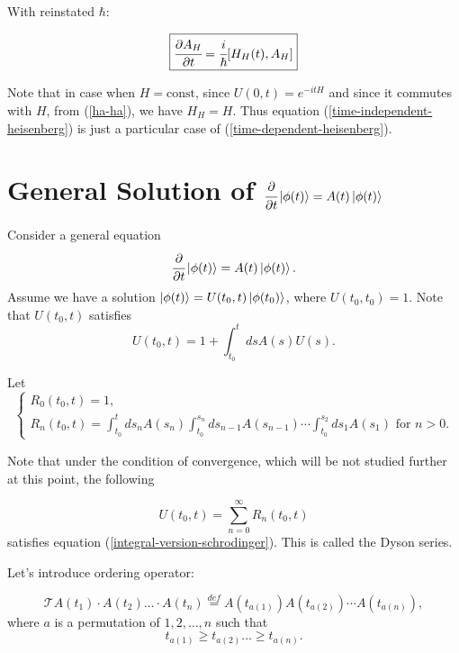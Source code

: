 \documentclass[main.tex]{subfiles}
\begin{document}
With reinstated $\hbar$:

\begin{equation}
\boxed{
\cfrac{\partial A_H}{\partial t} = \cfrac{i}{\hbar} [H_H(t), A_H]
}
\end{equation}

Note that in case when $H = \text{const}$, since $U(0, t) = e^{-itH}$ and since it commutes with $H$, from (\ref{ha-ha}), we have $H_H = H$. Thus equation (\ref{time-independent-heisenberg}) is just a particular case of (\ref{time-dependent-heisenberg}).
\section{General Solution of $\cfrac{\partial}{\partial t}\ket{\phi(t)} = A(t) \ket{\phi(t)}$}

Consider a general equation
\begin{equation}
\cfrac{\partial}{\partial t}\ket{\phi(t)} = A(t) \ket{\phi(t)}.
\end{equation}
Assume we have a solution $\ket{\phi(t)} = U(t_0, t)\ket{\phi(t_0)}$, where $U(t_0, t_0) = 1$. Note that 
$U(t_0, t)$ satisfies
\begin{equation}
\label{integral-version-schrodinger}
U(t_0, t) = 1 + \int_{t_0}^t ds A(s)U(s).
\end{equation}

Let
\begin{equation}
\begin{cases}
R_0(t_0, t) = 1,\\
R_n(t_0, t) = \int_{t_0}^t ds_n A(s_n) \int_{t_0}^{s_{n}} ds_{n - 1}A(s_{n-1}) \cdots \int_{t_0}^{s_2} ds_1 A(s_1)\text{ for } n > 0.
\end{cases}
\end{equation}

Note that under the condition of convergence, which will be not studied further at this point, the following

\begin{equation}
\label{generic-linear-solution}
U(t_0, t) = \sum_{n=0}^\infty R_n(t_0, t)
\end{equation}
satisfies equation (\ref{integral-version-schrodinger}). This is called the Dyson series.

Let's introduce ordering operator:
\begin{definition}
\begin{equation}
\mathcal{T} A(t_1)\cdot A(t_2) \dots \cdot A(t_n) \stackrel{def}{=} A(t_{a(1)})A(t_{a(2)})\cdots A(t_{a(n)}),
\end{equation} 
where $a$ is a permutation of $1, 2, \dots, n$ such that
\begin{equation}
t_{a(1)} \geq t_{a(2)} \dots \geq t_{a(n)}.
\end{equation}
\end{definition}
\end{document}

